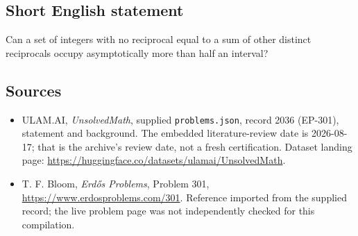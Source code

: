 \documentclass[11pt,a4paper]{article}
\begin{document}
\subsection{Short English statement}

Can a set of integers with no reciprocal equal to a sum of other distinct reciprocals occupy asymptotically more than half an interval?

\subsection{Sources}

{\small

\begin{itemize}

\item[\hypertarget{source:2036:1}{S1}] ULAM.AI, \emph{UnsolvedMath}, supplied \texttt{problems.json}, record 2036 (EP-301), statement and background. The embedded literature-review date is 2026-08-17; that is the archive’s review date, not a fresh certification. Dataset landing page: \url{https://huggingface.co/datasets/ulamai/UnsolvedMath}.

\item[\hypertarget{source:2036:2}{S2}] T. F. Bloom, \emph{Erdős Problems}, Problem 301, \url{https://www.erdosproblems.com/301}. Reference imported from the supplied record; the live problem page was not independently checked for this compilation.

\end{itemize}

}

\label{end:2036}
\end{document}

